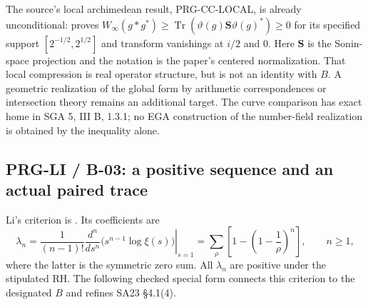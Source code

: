 \documentclass[11pt,a4paper]{article}
\newcommand{\Tr}{\operatorname{Tr}}
\newcommand{\fid}[1]{\textsf{#1}}
\begin{document}
The source's local archimedean result, \fid{PRG-CC-LOCAL}, is already unconditional: \cite[Introduction, Theorem 1, label \texttt{mainthmintro}]{cc} proves
$W_\infty(g*g^*)\ge\Tr(\vartheta(g)\mathbf S\vartheta(g)^*)\ge0$
for its specified support $[2^{-1/2},2^{1/2}]$ and transform vanishings at $i/2$ and $0$. Here $\mathbf S$ is the Sonin-space projection and the notation is the paper's centered normalization. That local compression is real operator structure, but is not an identity with $B$. A geometric realization of the global form by arithmetic correspondences or intersection theory remains an additional target. The curve comparison has exact home in SGA 5, III B, 1.3.1; no EGA construction of the number-field realization is obtained by the inequality alone.

\subsection{PRG-LI / B-03: a positive sequence and an actual paired trace}
Li's criterion is \cite[\S1, Theorem 1]{li}. Its coefficients are
\[
 \lambda_n=\frac1{(n-1)!}\left.\frac{d^n}{ds^n}
 \bigl(s^{n-1}\log\xi(s)\bigr)\right|_{s=1}
 =\sum_\rho\left[1-\left(1-\frac1\rho\right)^n\right],\qquad n\ge1,
\]
where the latter is the symmetric zero sum. All $\lambda_n$ are positive under the stipulated RH. The following checked special form connects this criterion to the designated $B$ and refines SA23 \S4.1(4).
\end{document}
